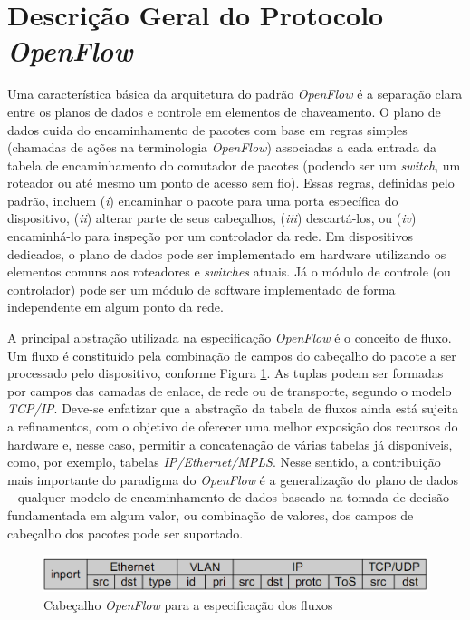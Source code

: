 \section{Descrição Geral do Protocolo \textit{OpenFlow}}

Uma característica básica da arquitetura do padrão \textit{OpenFlow} 
é a separação clara entre os planos de dados e controle em
elementos de chaveamento. O plano de dados cuida do 
encaminhamento de pacotes com base em regras simples (chamadas de ações 
na terminologia \textit{OpenFlow}) associadas
a cada entrada da tabela de encaminhamento do comutador 
de pacotes (podendo ser um \textit{switch}, um roteador 
ou até mesmo um ponto de acesso sem fio).
Essas regras, definidas pelo padrão, incluem (\textit{i}) 
encaminhar o pacote para uma porta específica do dispositivo,
(\textit{ii}) alterar parte de seus cabeçalhos, (\textit{iii}) 
descartá-los, ou (\textit{iv}) encaminhá-lo para inspeção 
por um controlador da rede. Em dispositivos dedicados, o plano
de dados pode ser implementado em hardware utilizando os
elementos comuns aos roteadores e \textit{switches} atuais.
Já o módulo de controle (ou controlador) pode ser um 
módulo de software implementado de forma independente em
algum ponto da rede.

A principal abstração utilizada na especificação
\textit{OpenFlow} é o conceito
de fluxo. Um fluxo é constituído pela combinação de campos
do cabeçalho do pacote a ser processado pelo dispositivo,
conforme Figura \ref{fig:cabecalhoOpenflow}. As tuplas podem
ser formadas por campos das camadas de enlace, de rede ou de
transporte, segundo o modelo \textit{TCP/IP}. Deve-se
enfatizar que a abstração da tabela de fluxos ainda está sujeita a
refinamentos, com o objetivo de oferecer uma melhor
exposição dos recursos do hardware e, nesse caso, permitir a
concatenação de várias tabelas já disponíveis, como, por
exemplo, tabelas \textit{IP/Ethernet/MPLS}. Nesse sentido, a
contribuição mais importante do paradigma do
\textit{OpenFlow} é a generalização do plano
de dados – qualquer modelo de encaminhamento de dados
baseado na tomada de decisão fundamentada em algum valor, ou
combinação de valores, dos campos de cabeçalho dos pacotes
pode ser suportado.

\begin{figure}[hb] \centering
\includegraphics[width=160mm]{cabecalhoOpenflow.png}
\caption{Cabeçalho \textit{OpenFlow} para a especificação dos fluxos}
\label{fig:cabecalhoOpenflow}
\end{figure}

